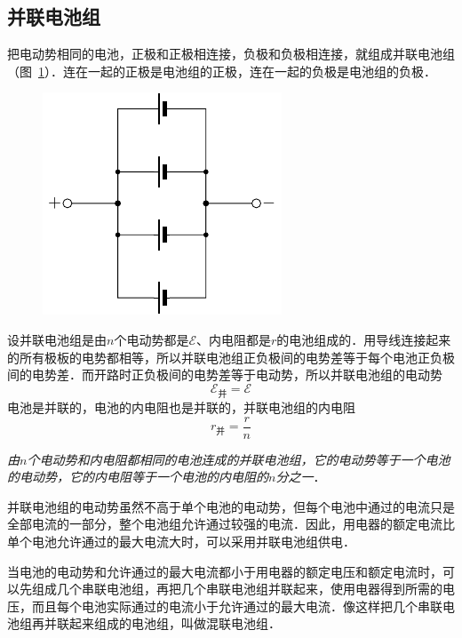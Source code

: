 \subsection{并联电池组}


把电动势相同的电池，正极和正极相连接，负极和负极相连接，就组成并联电池组（图~\ref{fig_B_7-35}）．连在一起的正极是电池组的正极，连在一起的负极是电池组的负极．
\begin{figure}[htbp]
    \centering
    \includegraphics{fig/B/7-35.pdf}
    \caption{}\label{fig_B_7-35}
\end{figure}

设并联电池组是由$n$个电动势都是$\mathcal{E}$、内电阻都是$r$的电池组成的．用导线连接起来的所有极板的电势都相等，所以并联电池组正负极间的电势差等于每个电池正负极间的电势差．而开路时正负极间的电势差等于电动势，所以并联电池组的电动势
\[\mathcal{E}_{\text{并}}=\mathcal{E} \]
电池是并联的，电池的内电阻也是并联的，并联电池组的内电阻
\[r_{\text{并}}=\frac{r}{n} \]

\textit{由$n$个电动势和内电阻都相同的电池连成的并联电池组，它的电动势等于一个电池的电动势，它的内电阻等于一个电池的内电阻的$n$分之一}．

并联电池组的电动势虽然不高于单个电池的电动势，但每个电池中通过的电流只是全部电流的一部分，整个电池组允许通过较强的电流．因此，用电器的额定电流比单个电池允许通过的最大电流大时，可以采用并联电池组供电．

当电池的电动势和允许通过的最大电流都小于用电器的额定电压和额定电流时，可以先组成几个串联电池组，再把几个串联电池组并联起来，使用电器得到所需的电压，而且每个电池实际通过的电流小于允许通过的最大电流．像这样把几个串联电池组再并联起来组成的电池组，叫做混联电池组．


